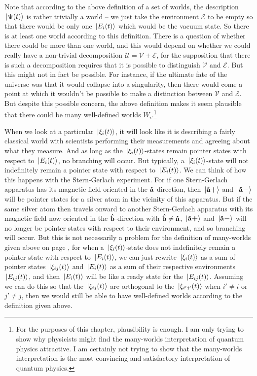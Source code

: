     Note that according to the above definition of a set of worlds, the description $\ket*{\Psi(t)}$ is rather trivially a world -- we just take the environment $\mathcal{E}$ to be empty so that there would be only one $\ket*{E_i(t)}$ which would be the vacuum state. So there is at least one world according to this definition. There is a question of whether there could be more than one world, and this would depend on whether we could really have a non-trivial decomposition $\mathcal{U}=\mathcal{V}+\mathcal{E}$, 
    for the supposition that there is such a decomposition requires that it is possible to distinguish $\mathcal{V}$ and $\mathcal{E}$. But this might not in fact be possible. For instance, if the ultimate fate of the universe was that it would collapse into a singularity, then there would come a point at which it wouldn't be possible to make a distinction between $\mathcal{V}$ and $\mathcal{E}$. { But despite this possible concern, the above definition makes it seem plausible that there could be many well-defined worlds $W_i$.\footnote{For the purposes of this chapter, plausibility is enough. I am only trying to show why physicists might find the many-worlds interpretation of quantum physics attractive. I am certainly not trying to show that the many-worlds interpretation is the most convincing and satisfactory interpretation of quantum physics. }}
    
    When we look at a particular $\ket*{\xi_i(t)}$, it will look like it is describing a fairly classical world with scientists performing their measurements and agreeing about what they measure. And as long as the $\ket*{\xi_i(t)}$-states remain pointer states with respect to $\ket*{E_i(t)}$, no branching will occur. But typically, a $\ket*{\xi_i(t)}$-state will not indefinitely remain a pointer state with respect to $\ket*{E_i(t)}$. We can think of how this happens with the Stern-Gerlach experiment. For if one Stern-Gerlach apparatus has its magnetic field oriented in the $\vb{\hat{{a}}}$-direction, then $\ket*{{\vb{\hat{{a}}}\bm{+}}}$ and $\ket*{{\vb{\hat{{a}}}\bm{-}}}$ will be pointer states for a silver atom in the vicinity of this apparatus. But if the same silver atom then travels onward to another Stern-Gerlach apparatus with its magnetic field now oriented in the $\vb{\hat{{b}}}$-direction with $\vb{\hat{{b}}}\neq\vb{\hat{{a}}}$, $\ket*{{\vb{\hat{{a}}}\bm{+}}}$ and $\ket*{{\vb{\hat{{a}}}\bm{-}}}$ will no longer be pointer states with respect to their environment, and so branching will occur. But this is not necessarily a problem for the definition of many-worlds given above on page \pageref{rigorousworld}, for when a $\ket*{\xi_i(t)}$-state does not indefinitely remain a pointer state with respect to $\ket*{E_i(t)}$, we can just rewrite $\ket*{\xi_i(t)}$ as a sum of pointer states $\ket*{\xi_{ij}(t)}$ and $\ket*{E_i(t)}$  as a sum of their respective environments $\ket*{E_{ij}(t)}$, and then $\ket*{E_i(t)}$ will be like a ready state for the $\ket*{E_{ij}(t)}$. Assuming we can do this so that the $\ket*{\xi_{ij}(t)}$ are orthogonal to the $\ket*{\xi_{i'j'}(t)}$ when $i'\neq i$ or $j'\neq j$, then we would still be able to have well-defined worlds according to the definition given above. 




   